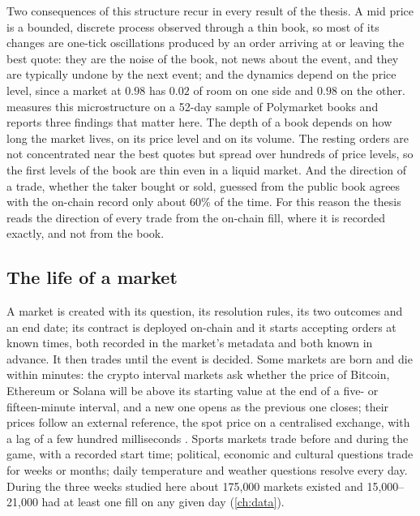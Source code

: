 Two consequences of this structure recur in every result of the thesis.  A mid price is a
bounded, discrete process observed through a thin book, so most of its changes are one-tick
oscillations produced by an order arriving at or leaving the best quote: they are the noise
of the book, not news about the event, and they are typically undone by the next event; and
the dynamics depend on the price level, since a market at $0.98$ has $0.02$ of room on one
side and $0.98$ on the other.
\textcite{dubach2026anatomy} measures this microstructure on a 52-day sample of Polymarket
books and reports three findings that matter here.  The depth of a book depends on how long
the market lives, on its price level and on its volume.  The resting orders are not
concentrated near the best quotes but spread over hundreds of price levels, so the first
levels of the book are thin even in a liquid market.  And the direction of a trade,
whether the taker bought or sold, guessed from the public book agrees with the on-chain
record only about 60\% of the time.  For this reason the thesis reads the direction of
every trade from the on-chain fill, where it is recorded exactly, and not from the book.

\subsection{The life of a market}
\label{sec:pm:life}

A market is created with its question, its resolution rules, its two outcomes and an end
date; its contract is deployed on-chain and it starts accepting orders at known times, both
recorded in the market's metadata and both known in advance.  It then trades until the event
is decided.  Some markets are born and die within minutes: the crypto interval markets ask
whether the price of Bitcoin, Ethereum or Solana will be above its starting value at the end
of a five- or fifteen-minute interval, and a new one opens as the previous one closes; their
prices follow an external reference, the spot price on a centralised exchange, with a lag of
a few hundred milliseconds \cite{young2026openmarket}.  Sports markets trade before and during
the game, with a recorded start time; political, economic and cultural questions trade for
weeks or months; daily temperature and weather questions resolve every day.  During the three
weeks studied here about 175{,}000 markets existed and 15{,}000--21{,}000 had at least one
fill on any given day (\cref{ch:data}).

